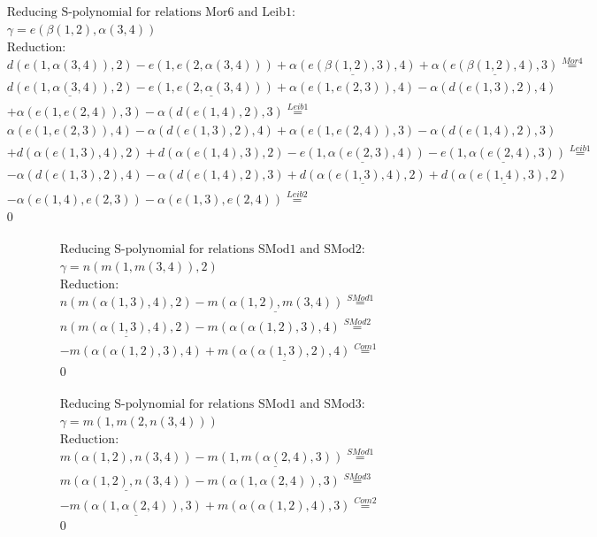 \documentclass[11pt]{amsart}
\begin{document}
\begin{align*} 
& \text{Reducing S-polynomial for relations Mor6 and Leib1:} \\ 
& \gamma = e(\beta(1,2),\alpha(3,4)) \\ 
& \text{Reduction}: \\&d(e(1,\alpha(3,4)),2) - e(1,e(2,\alpha(3,4))) + \underline{\alpha(e(\beta(1,2),3),4)} + \underline{\alpha(e(\beta(1,2),4),3)} \stackrel{ Mor4 }{=}  \\ 
&\underline{d(e(1,\alpha(3,4)),2)} - \underline{e(1,e(2,\alpha(3,4)))} + \alpha(e(1,e(2,3)),4) - \alpha(d(e(1,3),2),4)\\ 
 &  + \alpha(e(1,e(2,4)),3) - \alpha(d(e(1,4),2),3) \stackrel{ Leib1 }{=}  \\ 
&\alpha(e(1,e(2,3)),4) - \alpha(d(e(1,3),2),4) + \alpha(e(1,e(2,4)),3) - \alpha(d(e(1,4),2),3)\\ 
 &  + d(\alpha(e(1,3),4),2) + d(\alpha(e(1,4),3),2) - \underline{e(1,\alpha(e(2,3),4))} - \underline{e(1,\alpha(e(2,4),3))} \stackrel{ Leib1 }{=}  \\ 
& - \alpha(d(e(1,3),2),4) - \alpha(d(e(1,4),2),3) + \underline{d(\alpha(e(1,3),4),2)} + \underline{d(\alpha(e(1,4),3),2)}\\ 
 &  - \alpha(e(1,4),e(2,3)) - \alpha(e(1,3),e(2,4)) \stackrel{ Leib2 }{=}  \\ 
&0\\ 
\end{align*} 
 
\begin{align*} 
& \text{Reducing S-polynomial for relations SMod1 and SMod2:} \\ 
& \gamma = n(m(1,m(3,4)),2) \\ 
& \text{Reduction}: \\&n(m(\alpha(1,3),4),2) - \underline{m(\alpha(1,2),m(3,4))} \stackrel{ SMod1 }{=}  \\ 
&\underline{n(m(\alpha(1,3),4),2)} - m(\alpha(\alpha(1,2),3),4) \stackrel{ SMod2 }{=}  \\ 
& - m(\alpha(\alpha(1,2),3),4) + \underline{m(\alpha(\alpha(1,3),2),4)} \stackrel{ Com1 }{=}  \\ 
&0\\ 
\end{align*} 
 
\begin{align*} 
& \text{Reducing S-polynomial for relations SMod1 and SMod3:} \\ 
& \gamma = m(1,m(2,n(3,4))) \\ 
& \text{Reduction}: \\&m(\alpha(1,2),n(3,4)) - \underline{m(1,m(\alpha(2,4),3))} \stackrel{ SMod1 }{=}  \\ 
&\underline{m(\alpha(1,2),n(3,4))} - m(\alpha(1,\alpha(2,4)),3) \stackrel{ SMod3 }{=}  \\ 
& - \underline{m(\alpha(1,\alpha(2,4)),3)} + m(\alpha(\alpha(1,2),4),3) \stackrel{ Com2 }{=}  \\ 
&0\\ 
\end{align*} 
 
\end{document}
